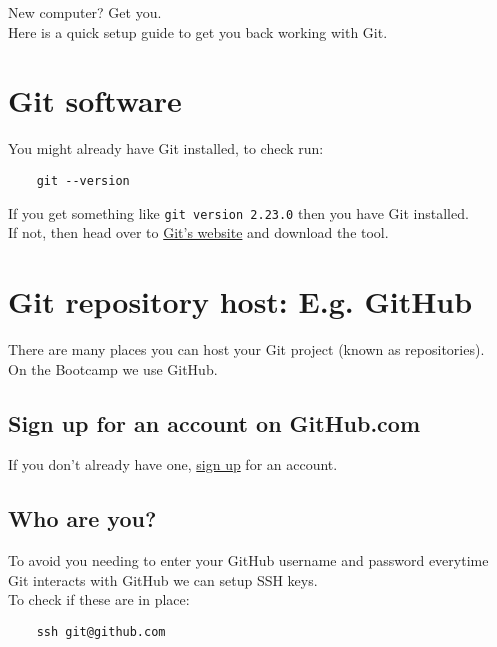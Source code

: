 New computer? Get you.
\\

Here is a quick setup guide to get you back working with Git.
\\

\section{Git software}

You might already have Git installed, to check run:

\begin{verbatim}
    git --version
\end{verbatim}

If you get something like \texttt{git version 2.23.0} then you have Git installed.
\\

If not, then head over to \href{https://git-scm.com/}{Git's website} and download the tool.

\section{Git repository host: E.g. GitHub}

There are many places you can host your Git project (known as repositories).
\\

On the Bootcamp we use GitHub.

\subsection{Sign up for an account on GitHub.com}

If you don't already have one, \href{https://github.com/join}{sign up} for an account.
\\

\subsection{Who are you?}

To avoid you needing to enter your GitHub username and password everytime Git interacts with GitHub we can setup SSH keys.
\\

To check if these are in place:

\begin{verbatim}
    ssh git@github.com
\end{verbatim}

